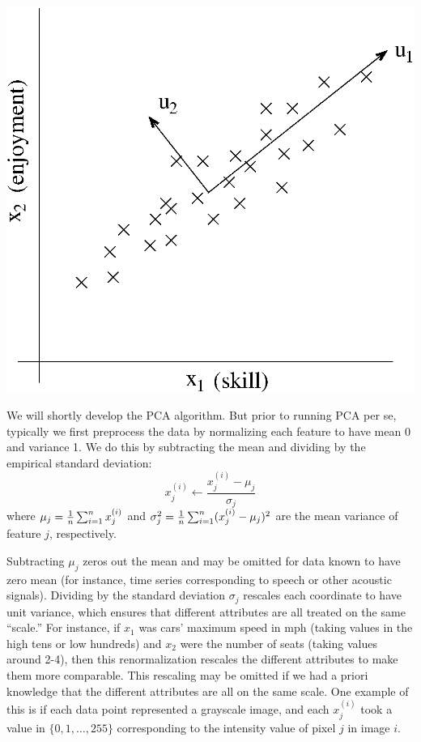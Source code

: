 \documentclass{article}
\begin{document}
\begin{center}
\includegraphics[scale=0.5]{heliPilot.eps}
\end{center}

We will shortly develop the PCA algorithm. But prior to running PCA per se, typically we first preprocess the data by normalizing each feature to have mean 0 and variance 1. We do this by subtracting the mean and dividing by the empirical standard deviation:
$$
x^{(i)}_j \leftarrow \frac{x^{(i)}_j - \mu_j}{\sigma_j}
$$
where $\mu_j = \frac{1}{{n}} \sum_{i=1}^{n} x^{(i)}_j$ and $\sigma_j^2 = \frac{1}{{n}} \sum_{i=1}^{n} (x^{(i)}_j - \mu_j)^2$ are the mean variance of feature $j$, respectively.

Subtracting $\mu_j$ zeros out the mean and may be omitted for data known to have zero mean (for instance, time series corresponding to speech or other acoustic signals). Dividing by the standard deviation $\sigma_j$ rescales each coordinate to have unit variance, which ensures that different attributes are all treated on the same ``scale.'' For instance, if $x_1$ was cars' maximum speed in mph (taking values in the high tens or low hundreds) and $x_2$ were the number of seats (taking values around 2-4), then this renormalization rescales the different attributes to make them more comparable. This rescaling may be omitted if we had a priori knowledge that the different attributes are all on the same scale. One example of this is if each data point represented a grayscale image, and each $x^{(i)}_j$ took a value in $\{0, 1, \ldots, 255\}$ corresponding to the intensity value of pixel $j$ in image $i$.
\end{document}
